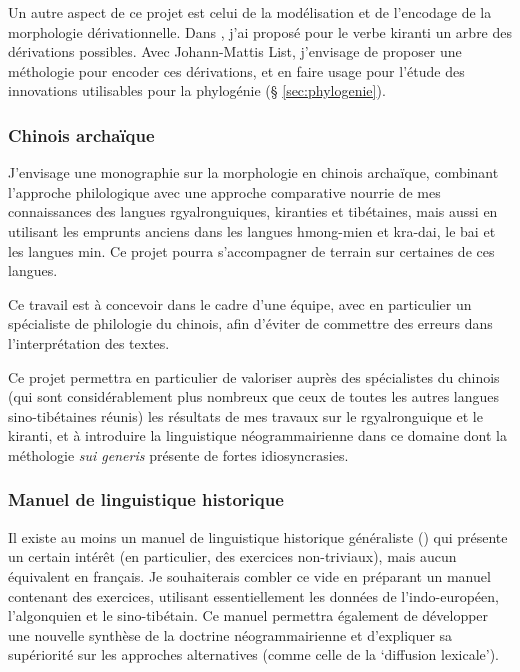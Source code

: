 \documentclass[oldfontcommands,oneside,a4paper,11pt]{article}
\begin{document}
Un autre aspect de ce projet est celui de la modélisation et de l'encodage de la morphologie dérivationnelle. Dans \citet{jacques17pkiranti}, j'ai proposé pour le verbe kiranti un arbre des dérivations possibles. Avec Johann-Mattis List, j'envisage de proposer une méthologie pour encoder ces dérivations, et en faire usage pour l'étude des innovations utilisables pour la phylogénie (§ \ref{sec:phylogenie}).

\subsubsection{Chinois archaïque} 

J'envisage une monographie sur la morphologie en chinois archaïque, combinant l'approche philologique avec une approche comparative nourrie de mes connaissances des langues rgyalronguiques, kiranties et tibétaines, mais aussi en utilisant les emprunts anciens dans les langues hmong-mien et kra-dai, le bai et les langues min. Ce projet pourra s'accompagner de terrain sur certaines de ces langues.

Ce travail est à concevoir dans le cadre d'une équipe, avec en particulier un spécialiste de philologie du chinois, afin d'éviter de commettre des erreurs dans l'interprétation des textes.  

Ce projet permettra en particulier de valoriser auprès des spécialistes du chinois (qui sont considérablement plus nombreux que ceux de toutes les autres langues sino-tibétaines réunis) les résultats de mes travaux sur le rgyalronguique et le kiranti, et à introduire la linguistique néogrammairienne dans ce domaine dont la méthologie \textit{sui generis} présente de fortes idiosyncrasies.


\subsubsection{Manuel de linguistique historique}

Il existe au moins un manuel de linguistique historique généraliste (\citealt{hock91principles}) qui présente un certain intérêt (en particulier, des exercices non-triviaux), mais aucun équivalent en français. Je souhaiterais combler ce vide en préparant un manuel contenant des exercices, utilisant essentiellement les données de l'indo-européen, l'algonquien et le sino-tibétain. Ce manuel permettra également de développer une nouvelle synthèse de la doctrine néogrammairienne et d'expliquer sa supériorité sur les approches alternatives  (comme celle de la `diffusion lexicale').
\end{document}
